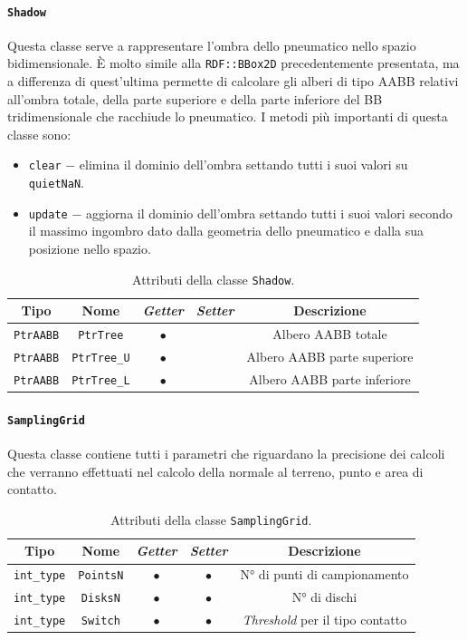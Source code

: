 \paragraph{\texttt{Shadow}}
Questa classe serve a rappresentare l'ombra dello pneumatico nello spazio bidimensionale. È molto simile alla \texttt{RDF::BBox2D} precedentemente presentata, ma a differenza di quest'ultima permette di calcolare gli alberi di tipo \ac{AABB} relativi all'ombra totale, della parte superiore e della parte inferiore del \ac{BB} tridimensionale che racchiude lo pneumatico. I metodi più importanti di questa classe sono:
\begin{itemize}
	\item \texttt{clear} $-$ elimina il dominio dell'ombra settando tutti i suoi valori su \texttt{quietNaN}.
	\item \texttt{update} $-$ aggiorna il dominio dell'ombra settando tutti i suoi valori secondo il massimo ingombro dato dalla geometria dello pneumatico e dalla sua posizione nello spazio.
\end{itemize}
\begin{table}[h!]
	\centering
	\begin{tabular}{|c|c|c|c|c|}
		\hline 
		\textbf{Tipo} & \textbf{Nome} & \textit{\textbf{Getter}} & \textit{\textbf{Setter}} & \textbf{Descrizione} \\ \hline 
		\texttt{PtrAABB} & \texttt{PtrTree} & $\bullet$ & & Albero \ac{AABB} totale\\ \hline
		\texttt{PtrAABB} & \texttt{PtrTree\_U} & $\bullet$ & & Albero \ac{AABB} parte superiore \\ \hline
		\texttt{PtrAABB} & \texttt{PtrTree\_L} & $\bullet$ & & Albero \ac{AABB} parte inferiore \\ \hline
	\end{tabular}
	\caption{Attributi della classe \texttt{Shadow}.}
	\label{}
\end{table}
%
\paragraph{\texttt{SamplingGrid}}
Questa classe contiene tutti i parametri che riguardano la precisione dei calcoli che verranno effettuati nel calcolo della normale al terreno, punto e area di contatto.
\begin{table}[h!]
	\centering
	\begin{tabular}{|c|c|c|c|c|}
		\hline 
		\textbf{Tipo} & \textbf{Nome} & \textit{\textbf{Getter}} & \textit{\textbf{Setter}} & \textbf{Descrizione} \\ \hline 
		\texttt{int\_type} & \texttt{PointsN} & $\bullet$ & $\bullet$ & N° di punti di campionamento \\ \hline 
		\texttt{int\_type} & \texttt{DisksN} & $\bullet$ & $\bullet$ & N° di dischi \\ \hline 
		\texttt{int\_type} & \texttt{Switch} & $\bullet$ & $\bullet$ & \textit{Threshold} per il tipo contatto \\ \hline
	\end{tabular}
	\caption{Attributi della classe \texttt{SamplingGrid}.}
	\label{}
\end{table}
%
